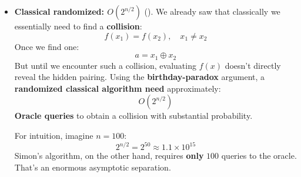 \begin{itemize}
    \item[\textcolor{Red2}{\faIcon{hourglass-half}}] \textbf{Classical randomized: $O\left(2^{n/2}\right)$} (). We already saw that classically we essentially need to find a \textbf{collision}:
        \begin{equation*}
            f(x_1) = f(x_2), \quad x_1 \neq x_2
        \end{equation*}
        Once we find one:
        \begin{equation*}
            a = x_1 \oplus x_2
        \end{equation*}
        But until we encounter such a collision, evaluating $f(x)$ doesn't directly reveal the hidden pairing. Using the \textbf{birthday-paradox} argument, a \textbf{randomized classical algorithm need} approximately:
        \begin{equation*}
            O\left(2^{n/2}\right)
        \end{equation*}
        \textbf{Oracle queries} to obtain a collision with substantial probability.

        For intuition, imagine $n=100$:
        \begin{equation*}
            2^{n/2} = 2^{50} \approx 1.1 \times 10^{15}
        \end{equation*}
        Simon's algorithm, on the other hand, requires \textbf{only} $100$ queries to the oracle. That's an enormous asymptotic separation.


\end{itemize}
